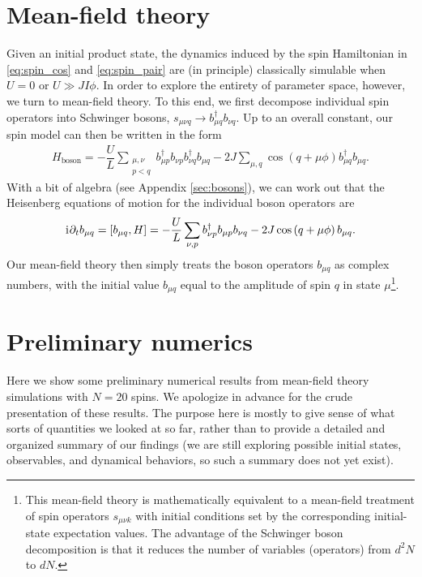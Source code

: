 \documentclass[nofootinbib,notitlepage,11pt]{revtex4-2}
\renewcommand{\t}{\text} %
\newcommand{\f}[2]{\dfrac{#1}{#2}} %
\newcommand{\p}[1]{\left(#1\right)} %
\renewcommand{\sp}[1]{\left[#1\right]} %
\renewcommand{\d}{\partial} %
\renewcommand{\i}{\mathrm{i}\mkern1mu} %
\newcommand{\1}{\mathds{1}}
\begin{document}
\section{Mean-field theory}

Given an initial product state, the dynamics induced by the spin Hamiltonian in \eqref{eq:spin_cos} and \eqref{eq:spin_pair} are (in principle) classically simulable when $U=0$ or $U\gg JI\phi$.
In order to explore the entirety of parameter space, however, we turn to mean-field theory.
To this end, we first decompose individual spin operators into Schwinger bosons, $s_{\mu\nu q}\to b_{\mu q}^\dag b_{\nu q}$.
Up to an overall constant, our spin model can then be written in the form
\begin{align}
  H_{\t{boson}} = - \f{U}{L} \sum_{\substack{\mu,\nu\\p<q}}
  b_{\mu p}^\dag b_{\nu p} b_{\nu q}^\dag b_{\mu q}
  - 2J \sum_{\mu,q} \cos\p{q+\mu\phi} b_{\mu q}^\dag b_{\mu q}.
\end{align}
With a bit of algebra (see Appendix \ref{sec:bosons}), we can work out that the Heisenberg equations of motion for the individual boson operators are
\begin{align}
  \i \d_t b_{\mu q} = \sp{b_{\mu q},H}
  = -\f{U}{L} \sum_{\nu,p} b_{\nu p}^\dag b_{\mu p} b_{\nu q}
  - 2J \cos\p{q+\mu\phi} b_{\mu q}.
\end{align}
Our mean-field theory then simply treats the boson operators $b_{\mu q}$ as complex numbers, with the initial value $b_{\mu q}$ equal to the amplitude of spin $q$ in state $\mu$\footnote{This mean-field theory is mathematically equivalent to a mean-field treatment of spin operators $s_{\mu\nu k}$ with initial conditions set by the corresponding initial-state expectation values.  The advantage of the Schwinger boson decomposition is that it reduces the number of variables (operators) from $d^2 N$ to $dN$.}.

\section{Preliminary numerics}
\label{sec:numerics}

Here we show some preliminary numerical results from mean-field theory simulations with $N=20$ spins.
We apologize in advance for the crude presentation of these results.
The purpose here is mostly to give sense of what sorts of quantities we looked at so far, rather than to provide a detailed and organized summary of our findings (we are still exploring possible initial states, observables, and dynamical behaviors, so such a summary does not yet exist).
\end{document}
